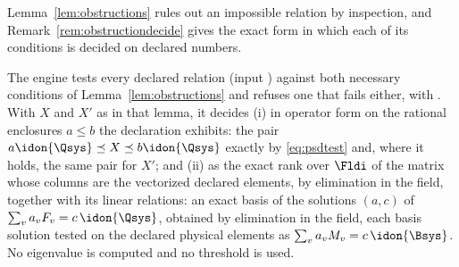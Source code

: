 
Lemma~\ref{lem:obstructions} rules out an impossible relation by inspection,
and Remark~\ref{rem:obstructiondecide} gives the exact form in which each of
its conditions is decided on declared numbers.

\begin{requirement}\label{req:declared-relation-check}
The engine tests every declared relation (input )
against both necessary conditions of Lemma~\ref{lem:obstructions} and
refuses one that fails either, with .
With $X$ and $X'$ as in that lemma, it decides (i) in operator form on the
rational enclosures $a\le b$ the declaration exhibits: the pair $a\idon{\Qsys}\preceq X\preceq b\idon{\Qsys}$
exactly by \eqref{eq:psdtest} and, where it holds, the same pair for $X'$;
and (ii) as the exact rank over $\Fldi$ of the matrix whose columns are the
vectorized declared elements, by elimination in the field, together with its
linear relations: an exact basis of the solutions $(a,c)$ of
$\sum_va_vF_v=c\,\idon{\Qsys}$, obtained by elimination in the field, each
basis solution tested on the declared physical elements as
$\sum_va_vM_v=c\,\idon{\Bsys}$. No eigenvalue is computed and no threshold is
used.
\end{requirement}

